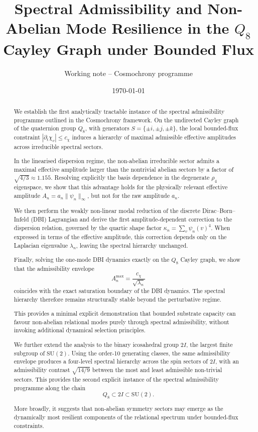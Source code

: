 \documentclass[11pt,a4paper]{article}
\title{Spectral Admissibility and Non-Abelian Mode Resilience
in the $Q_8$ Cayley Graph under Bounded Flux}
\author{Working note -- Cosmochrony programme}
\date{\today}
\begin{document}
  \maketitle

  \begin{abstract}
    We establish the first analytically tractable instance of the spectral admissibility
    programme outlined in the Cosmochrony framework.
    On the undirected Cayley graph of the quaternion group $Q_8$, with generators
    $S = \{\pm i, \pm j, \pm k\}$, the local bounded-flux constraint
    $|\partial_t \chi_v| \leq c_\chi$ induces a hierarchy of maximal admissible
    effective amplitudes across irreducible spectral sectors.

    In the linearised dispersion regime, the non-abelian irreducible sector
    admits a maximal effective amplitude larger than the nontrivial abelian sectors
    by a factor of $\sqrt{4/3} \approx 1.155$.
    Resolving explicitly the basis dependence in the degenerate $\rho_4$ eigenspace,
    we show that this advantage holds for the physically relevant effective amplitude
    $A_n = a_n \|\psi_n\|_\infty$, but not for the raw amplitude $a_n$.

    We then perform the weakly non-linear modal reduction of the discrete
    Dirac--Born--Infeld (DBI) Lagrangian and derive the first amplitude-dependent
    correction to the dispersion relation, governed by the quartic shape factor
    $\kappa_n = \sum_v \psi_n(v)^4$.
    When expressed in terms of the effective amplitude, this correction depends
    only on the Laplacian eigenvalue $\lambda_n$, leaving the spectral hierarchy
    unchanged.

    Finally, solving the one-mode DBI dynamics exactly on the $Q_8$ Cayley graph,
    we show that the admissibility envelope
    \[
      A_n^{\max} = \frac{c_\chi}{\sqrt{\lambda_n}}
    \]
    coincides with the exact saturation boundary of the DBI dynamics.
    The spectral hierarchy therefore remains structurally stable beyond the
    perturbative regime.

    This provides a minimal explicit demonstration that bounded substrate capacity
    can favour non-abelian relational modes purely through spectral admissibility,
    without invoking additional dynamical selection principles.

    We further extend the analysis to the binary icosahedral group $2I$,
    the largest finite subgroup of $\mathrm{SU}(2)$.
    Using the order-10 generating classes, the same admissibility envelope
    produces a four-level spectral hierarchy across the spin sectors of $2I$,
    with an admissibility contrast $\sqrt{14/9}$ between the most and least
    admissible non-trivial sectors.
    This provides the second explicit instance of the spectral admissibility
    programme along the chain
    \[
      Q_8 \subset 2I \subset \mathrm{SU}(2).
    \]

    More broadly, it suggests that non-abelian symmetry sectors may emerge
    as the dynamically most resilient components of the relational spectrum
    under bounded-flux constraints.
  \end{abstract}
\end{document}

